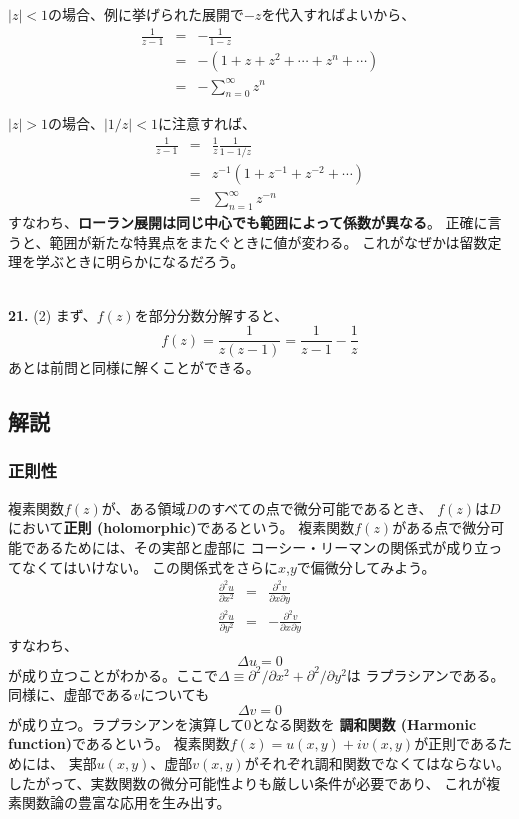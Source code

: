 \documentclass{jarticle}
\newcommand{\ans}[2]{\noindent\\ {\bf \large #1.} (#2)}
\begin{document}
$|z|<1$の場合、例に挙げられた展開で$-z$を代入すればよいから、
\begin{eqnarray}
  \frac{1}{z-1} &=& - \frac{1}{1-z}\\
  &=& -(1 + z + z^2 + \cdots + z^n + \cdots) \\
  &=& -\sum_{n=0}^{\infty} z^n
\end{eqnarray}

$|z|>1$の場合、$|1/z|<1$に注意すれば、
\begin{eqnarray}
  \frac{1}{z-1} &=& \frac{1}{z} \frac{1}{1 - 1/z}\\
  &=& z^{-1}
  \left(
  1 + z^{-1}+ z^{-2}+ \cdots
  \right)\\
  &=& \sum_{n=1}^{\infty} z^{-n}
\end{eqnarray}
すなわち、{\bf ローラン展開は同じ中心でも範囲によって係数が異なる}。
正確に言うと、範囲が新たな特異点をまたぐときに値が変わる。
これがなぜかは留数定理を学ぶときに明らかになるだろう。

\ans{21}{2}
まず、$f(z)$を部分分数分解すると、
\begin{equation}
  f(z) = \frac{1}{z(z-1)} = \frac{1}{z-1} - \frac{1}{z}
\end{equation}
あとは前問と同様に解くことができる。

\subsection{解説}

\subsubsection{正則性}
複素関数$f(z)$が、ある領域$D$のすべての点で微分可能であるとき、
$f(z)$は$D$において{\bf 正則 (holomorphic)}であるという。
複素関数$f(z)$がある点で微分可能であるためには、その実部と虚部に
コーシー・リーマンの関係式が成り立ってなくてはいけない。
この関係式をさらに$x$,$y$で偏微分してみよう。
\begin{eqnarray}
  \frac{\partial^2 u}{\partial x^2} &=& \frac{\partial^2 v}{\partial x \partial y}\\
  \frac{\partial^2 u}{\partial y^2} &=& - \frac{\partial^2 v}{\partial x \partial y}
\end{eqnarray}
すなわち、
\begin{equation}
  \Delta u = 0
\end{equation}
が成り立つことがわかる。ここで$\Delta \equiv \partial^2/\partial x^2 + \partial^2/\partial y^2$は
ラプラシアンである。
同様に、虚部である$v$についても
\begin{equation}
  \Delta v = 0
\end{equation}
が成り立つ。ラプラシアンを演算して0となる関数を
{\bf 調和関数 (Harmonic function)}であるという。
複素関数$f(z)= u(x,y) + i v(x,y)$が正則であるためには、
実部$u(x,y)$、虚部$v(x,y)$がそれぞれ調和関数でなくてはならない。
したがって、実数関数の微分可能性よりも厳しい条件が必要であり、
これが複素関数論の豊富な応用を生み出す。
\end{document}
